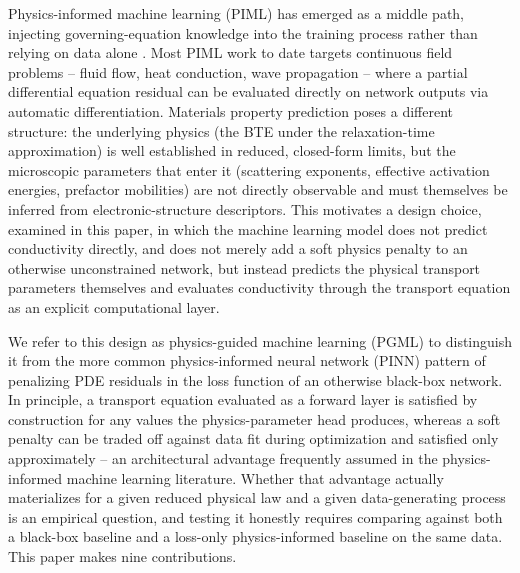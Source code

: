 \documentclass[11pt]{article}
\begin{document}
Physics-informed machine learning (PIML) has emerged as a middle path, injecting governing-equation knowledge into the training process rather than relying on data alone \citep{raissi2019pinn,karniadakis2021pgml,willard2020integrating}. Most PIML work to date targets continuous field problems -- fluid flow, heat conduction, wave propagation -- where a partial differential equation residual can be evaluated directly on network outputs via automatic differentiation. Materials property prediction poses a different structure: the underlying physics (the BTE under the relaxation-time approximation) is well established in reduced, closed-form limits, but the microscopic parameters that enter it (scattering exponents, effective activation energies, prefactor mobilities) are not directly observable and must themselves be inferred from electronic-structure descriptors. This motivates a design choice, examined in this paper, in which the machine learning model does not predict conductivity directly, and does not merely add a soft physics penalty to an otherwise unconstrained network, but instead predicts the physical transport parameters themselves and evaluates conductivity through the transport equation as an explicit computational layer.

We refer to this design as physics-guided machine learning (PGML) to distinguish it from the more common physics-informed neural network (PINN) pattern of penalizing PDE residuals in the loss function of an otherwise black-box network. In principle, a transport equation evaluated as a forward layer is satisfied by construction for any values the physics-parameter head produces, whereas a soft penalty can be traded off against data fit during optimization and satisfied only approximately -- an architectural advantage frequently assumed in the physics-informed machine learning literature. Whether that advantage actually materializes for a given reduced physical law and a given data-generating process is an empirical question, and testing it honestly requires comparing against both a black-box baseline and a loss-only physics-informed baseline on the same data. This paper makes nine contributions.
\end{document}
